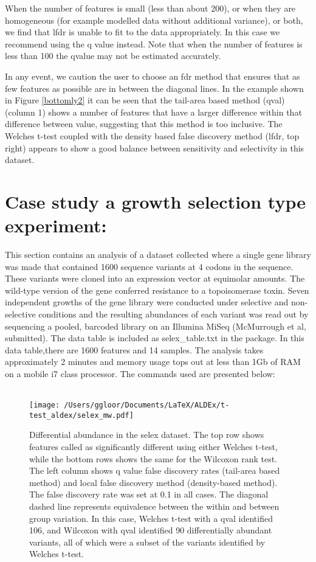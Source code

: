 \documentclass[11pt]{amsart}
\begin{document}
When the number of features is small  (less than about 200), or when they are homogeneous (for example modelled data without additional variance), or both, we find that lfdr is unable to fit to the data appropriately.  In this case we recommend using the q value instead. Note that when the number of features is less than 100 the qvalue may not be estimated accurately. 

In any event, we caution the user to choose an fdr method that ensures that as few features as possible are in between the diagonal lines. In the example shown in Figure \ref{bottomly2} it can be seen that the tail-area based method (qval) (column 1) shows a number of features that have a larger difference within that difference between value, suggesting that this method is too inclusive. The Welches t-test coupled with the density based false discovery method (lfdr, top right) appears to show a good balance between sensitivity and selectivity in this dataset.

\section{Case study a growth selection type experiment:} This section contains an analysis of a dataset collected where a single gene  library was made that contained 1600 sequence variants at 4 codons in the sequence. These variants were cloned into an expression vector at equimolar amounts. The wild-type version of the gene conferred resistance to a topoisomerase toxin. Seven independent growths of the gene library were conducted under selective and non-selective conditions and the resulting abundances of each variant was read out by sequencing a pooled, barcoded library on an Illumina MiSeq (McMurrough et al, submitted). The data table is included as selex\_table.txt in the package. In this data table,there are 1600 features and 14 samples. The analysis takes approximately 2 minutes and memory usage tops out at less than 1Gb of RAM on a mobile i7 class processor.  The commands used are presented below:\\\\

\begin{figure}[!t]
\begin{center}
\texttt{[image: /Users/ggloor/Documents/LaTeX/ALDEx/t-test\_aldex/selex\_mw.pdf]}
\caption{Differential abundance in the selex dataset. The top row shows features called as significantly different using either Welches t-test, while the bottom rows shows the same for the Wilcoxon rank test. The left column shows q value false discovery rates (tail-area based method) and local false discovery method (density-based method). The false discovery rate was set at 0.1 in all cases. The diagonal dashed line represents equivalence between the within and between group variation. In this case, Welches t-test with a qval identified 106, and Wilcoxon with qval identified 90 differentially abundant variants, all of which were a subset of the variants identified by Welches t-test. }
\label{selex}
\end{center}
\end{figure}
\end{document}
